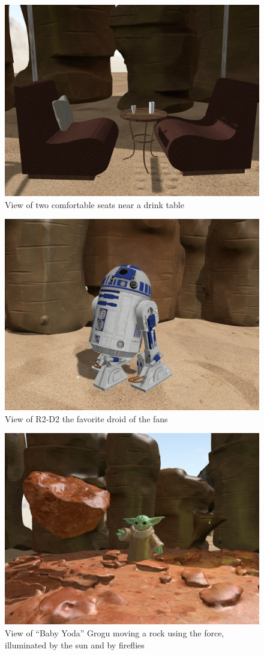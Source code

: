 \begin{figure}
    \centering
    \includegraphics[width=.75\linewidth]{img/seats.png}
    \caption{View of two comfortable seats near a drink table}
    \label{fig:seats}
\end{figure}

\begin{figure}
    \centering
    \includegraphics[width=.75\linewidth]{img/r2-d2.png}
    \caption{View of R2-D2 the favorite droid of the fans}
    \label{fig:r2-d2}
\end{figure}

\begin{figure}
    \centering
    \includegraphics[width=.75\linewidth]{img/baby_yoda.png}
    \caption{View of ``Baby Yoda'' Grogu moving a rock using the force, illuminated by the sun and by fireflies}
    \label{fig:baby_yoda}
\end{figure}

